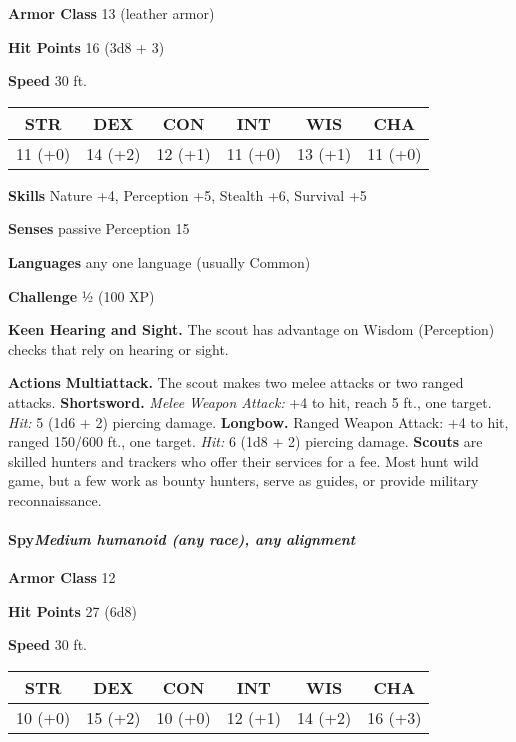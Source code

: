 \documentclass[
]{article}
\begin{document}
\textbf{Armor Class} 13 (leather armor)

\textbf{Hit Points} 16 (3d8 + 3)

\textbf{Speed} 30 ft.

\begin{longtable}[]{@{}cccccc@{}}
\toprule
STR & DEX & CON & INT & WIS & CHA\tabularnewline
\midrule
\endhead
11 (+0) & 14 (+2) & 12 (+1) & 11 (+0) & 13 (+1) & 11 (+0)\tabularnewline
\bottomrule
\end{longtable}

\textbf{Skills} Nature +4, Perception +5, Stealth +6, Survival +5

\textbf{Senses} passive Perception 15

\textbf{Languages} any one language (usually Common)

\textbf{Challenge} ½ (100 XP)

\textbf{Keen Hearing and Sight.} The scout has advantage on Wisdom
(Perception) checks that rely on hearing or sight.

\textbf{Actions} \textbf{Multiattack.} The scout makes two melee attacks
or two ranged attacks. \textbf{Shortsword.} \emph{Melee Weapon Attack:}
+4 to hit, reach 5 ft., one target. \emph{Hit:} 5 (1d6 + 2) piercing
damage. \textbf{Longbow.} Ranged Weapon Attack: +4 to hit, ranged
150/600 ft., one target. \emph{Hit:} 6 (1d8 + 2) piercing damage.
\textbf{Scouts} are skilled hunters and trackers who offer their
services for a fee. Most hunt wild game, but a few work as bounty
hunters, serve as guides, or provide military reconnaissance.

\hypertarget{spymedium-humanoid-any-race-any-alignment}{%
\paragraph{\texorpdfstring{Spy\emph{Medium humanoid (any race), any
alignment}}{SpyMedium humanoid (any race), any alignment}}\label{spymedium-humanoid-any-race-any-alignment}}

\textbf{Armor Class} 12

\textbf{Hit Points} 27 (6d8)

\textbf{Speed} 30 ft.

\begin{longtable}[]{@{}cccccc@{}}
\toprule
STR & DEX & CON & INT & WIS & CHA\tabularnewline
\midrule
\endhead
10 (+0) & 15 (+2) & 10 (+0) & 12 (+1) & 14 (+2) & 16 (+3)\tabularnewline
\bottomrule
\end{longtable}
\end{document}
